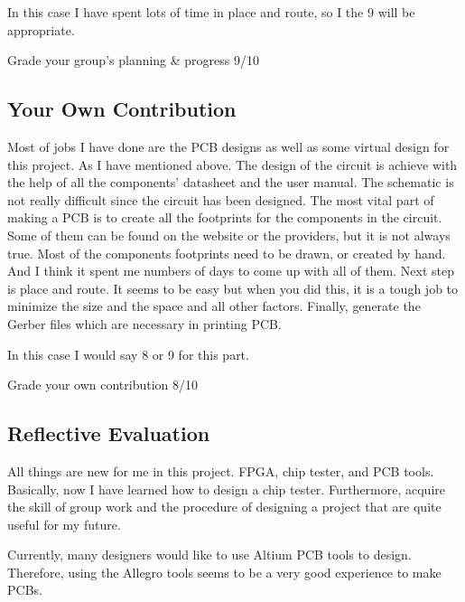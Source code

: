 In this case I have spent lots of time in place and route, so I the 9 will be appropriate.

Grade your group’s planning \& progress	9/10


\subsection{Your Own Contribution}

Most of jobs I have done are the PCB designs as well as some virtual design for this project. As I have mentioned above. The design of the circuit is achieve with the help of all the components’ datasheet and the user manual. The schematic is not really difficult since the circuit has been designed. The most vital part of making a PCB is to create all the footprints for the components in the circuit. Some of them can be found on the website or the providers, but it is not always true. Most of the components footprints need to be drawn, or created by hand. And I think it spent me numbers of days to come up with all of them. Next step is place and route. It seems to be easy but when you did this, it is a tough job to minimize the size and the space and all other factors. Finally, generate the Gerber files which are necessary in printing PCB.

In this case I would say 8 or 9 for this part.

Grade your own contribution	 8/10

\subsection{Reflective Evaluation}

All things are new for me in this project. FPGA, chip tester, and PCB tools. Basically, now I have learned how to design a chip tester. Furthermore, acquire the skill of group work and the procedure of designing a project that are quite useful for my future.

Currently, many designers would like to use Altium PCB tools to design. Therefore, using the Allegro tools seems to be a very good experience to make PCBs.